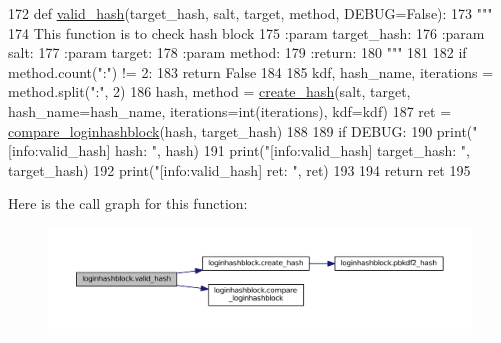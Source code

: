\begin{DoxyCode}
172 \textcolor{keyword}{def }\hyperlink{namespaceloginhashblock_ac7faa165bc305e611390727f11946424}{valid\_hash}(target\_hash, salt, target, method, DEBUG=False):
173     \textcolor{stringliteral}{"""}
174 \textcolor{stringliteral}{    This function is to check hash block}
175 \textcolor{stringliteral}{    :param target\_hash:}
176 \textcolor{stringliteral}{    :param salt:}
177 \textcolor{stringliteral}{    :param target:}
178 \textcolor{stringliteral}{    :param method:}
179 \textcolor{stringliteral}{    :return:}
180 \textcolor{stringliteral}{    """}
181 
182     \textcolor{keywordflow}{if} method.count(\textcolor{stringliteral}{":"}) != 2:
183         \textcolor{keywordflow}{return} \textcolor{keyword}{False}
184 
185     kdf, hash\_name, iterations = method.split(\textcolor{stringliteral}{":"}, 2)
186     hash, method = \hyperlink{namespaceloginhashblock_a935d8ae1c51e50f9e5db6a1d5f02b1b8}{create\_hash}(salt, target, hash\_name=hash\_name, iterations=int(iterations), 
      kdf=kdf)
187     ret = \hyperlink{namespaceloginhashblock_ac24dd842eb90e0ede55e842d44148d5b}{compare\_loginhashblock}(hash, target\_hash)
188 
189     \textcolor{keywordflow}{if} DEBUG:
190         print(\textcolor{stringliteral}{"[info:valid\_hash]        hash: "}, hash)
191         print(\textcolor{stringliteral}{"[info:valid\_hash] target\_hash: "}, target\_hash)
192         print(\textcolor{stringliteral}{"[info:valid\_hash]         ret: "}, ret)
193 
194     \textcolor{keywordflow}{return} ret
195 
\end{DoxyCode}


Here is the call graph for this function\+:\nopagebreak
\begin{figure}[H]
\begin{center}
\leavevmode
\includegraphics[width=350pt]{namespaceloginhashblock_ac7faa165bc305e611390727f11946424_cgraph}
\end{center}
\end{figure}


